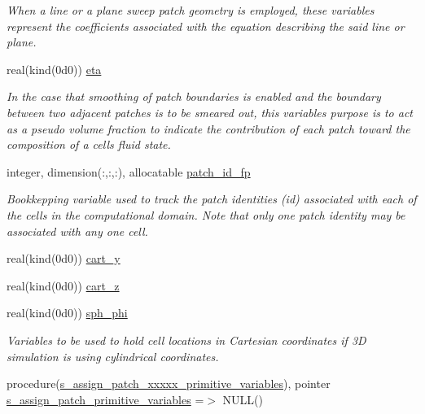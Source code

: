 \begin{DoxyCompactItemize}
\begin{DoxyCompactList}\small\item\em When a line or a plane sweep patch geometry is employed, these variables represent the coefficients associated with the equation describing the said line or plane. \end{DoxyCompactList}\item 
real(kind(0d0)) \hyperlink{namespacem__initial__condition_a44e267143646437278341b252110443b}{eta}
\begin{DoxyCompactList}\small\item\em In the case that smoothing of patch boundaries is enabled and the boundary between two adjacent patches is to be smeared out, this variable\textquotesingle{}s purpose is to act as a pseudo volume fraction to indicate the contribution of each patch toward the composition of a cell\textquotesingle{}s fluid state. \end{DoxyCompactList}\item 
integer, dimension(\+:,\+:,\+:), allocatable \hyperlink{namespacem__initial__condition_a0014f6589f0b33ea2372c1d4b7f0c824}{patch\+\_\+id\+\_\+fp}
\begin{DoxyCompactList}\small\item\em Bookkepping variable used to track the patch identities (id) associated with each of the cells in the computational domain. Note that only one patch identity may be associated with any one cell. \end{DoxyCompactList}\item 
real(kind(0d0)) \hyperlink{namespacem__initial__condition_a71a9905eff9a292e2fc61b0e25e47db0}{cart\+\_\+y}
\item 
real(kind(0d0)) \hyperlink{namespacem__initial__condition_a224e30cb2d1e2e99f2c2c059a1227d49}{cart\+\_\+z}
\item 
real(kind(0d0)) \hyperlink{namespacem__initial__condition_aba65d4cbd29f3b8eda828037c7215e2d}{sph\+\_\+phi}
\begin{DoxyCompactList}\small\item\em Variables to be used to hold cell locations in Cartesian coordinates if 3D simulation is using cylindrical coordinates. \end{DoxyCompactList}\item 
procedure(\hyperlink{interfacem__initial__condition_1_1s__assign__patch__xxxxx__primitive__variables}{s\+\_\+assign\+\_\+patch\+\_\+xxxxx\+\_\+primitive\+\_\+variables}), pointer \hyperlink{namespacem__initial__condition_a3151c58d3a628c7ac8aff34bce727867}{s\+\_\+assign\+\_\+patch\+\_\+primitive\+\_\+variables} =$>$ N\+U\+LL()
\end{DoxyCompactItemize}


